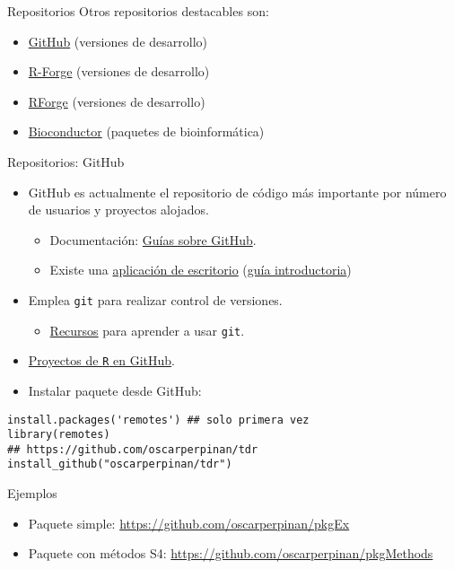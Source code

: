 \documentclass[xcolor={usenames,svgnames,dvipsnames}]{beamer}
\begin{document}
\begin{frame}[label={sec:org45885a8}]{Repositorios}
Otros repositorios destacables son:

\begin{itemize}
\item \href{https://github.com/}{GitHub} (versiones de desarrollo)

\item \href{http://r-forge.r-project.org/}{R-Forge} (versiones de desarrollo)

\item \href{http://rforge.net/}{RForge} (versiones de desarrollo)

\item \href{http://www.bioconductor.org/}{Bioconductor} (paquetes de bioinformática)
\end{itemize}
\end{frame}

\begin{frame}[fragile,label={sec:org5d1a867}]{Repositorios: GitHub}
 \begin{itemize}
\item GitHub es actualmente el repositorio de código más importante por número de usuarios y proyectos alojados.
\begin{itemize}
\item Documentación: \href{https://guides.github.com/}{Guías sobre GitHub}.
\item Existe una \href{https://desktop.github.com/}{aplicación de escritorio} (\href{https://help.github.com/desktop/guides/getting-started/}{guía introductoria})
\end{itemize}
\item Emplea \texttt{git} para realizar control de versiones.
\begin{itemize}
\item \href{https://help.github.com/articles/good-resources-for-learning-git-and-github/}{Recursos} para aprender a usar \texttt{git}.
\end{itemize}
\item \href{https://github.com/search?o=desc\&q=language:R\&ref=searchresults\&s=stars\&type=Repositories}{Proyectos de \texttt{R} en GitHub}.
\item Instalar paquete desde GitHub:
\end{itemize}
\lstset{language=r,label= ,caption= ,captionpos=b,numbers=none}
\begin{lstlisting}
install.packages('remotes') ## solo primera vez
library(remotes)
## https://github.com/oscarperpinan/tdr
install_github("oscarperpinan/tdr") 
\end{lstlisting}
\end{frame}

\begin{frame}[label={sec:orgb62d706}]{Ejemplos}
\begin{itemize}
\item Paquete simple: \url{https://github.com/oscarperpinan/pkgEx}
\item Paquete con métodos S4: \url{https://github.com/oscarperpinan/pkgMethods}
\end{itemize}
\end{frame}
\end{document}
